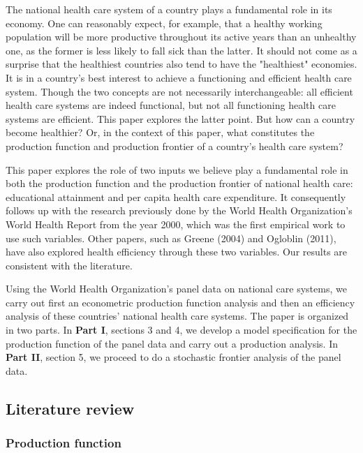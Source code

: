 \documentclass[12pt,a4paper]{article}\usepackage[]{graphicx}\usepackage[]{color}
\begin{document}
The national health care system of a country plays a fundamental role in its economy. One can reasonably expect, for example, that a healthy working population will be more productive throughout its active years than an unhealthy one, as the former is less likely to fall sick than the latter. It should not come as a surprise that the healthiest countries also tend to have the "healthiest" economies. It is in a country's best interest to achieve a functioning and efficient health care system. Though the two concepts are not necessarily interchangeable: all efficient health care systems are indeed functional, but not all functioning health care systems are efficient. This paper explores the latter point. But how can a country become healthier? Or, in the context of this paper, what constitutes the production function and production frontier of a country's health care system?

This paper explores the role of two inputs we believe play a fundamental role in both the production function and the production frontier of national health care: educational attainment and per capita health care expenditure. It consequently follows up with the research previously done by the World Health Organization's World Health Report from the year 2000, which was the first empirical work to use such variables.  Other papers, such as Greene (2004) and Ogloblin (2011), have also explored health efficiency through these two variables. Our results are consistent with the literature.

Using the World Health Organization's panel data on national care systems, we carry out first an econometric production function analysis and then an efficiency analysis of these countries' national health care systems. The paper is organized in two parts. In \textbf{Part I}, sections 3 and 4, we develop a model specification for the production function of the panel data and carry out a production analysis. In \textbf{Part II}, section 5, we proceed to do a stochastic frontier analysis of the panel data.

\subsection{Literature review}
\subsubsection{Production function}
\end{document}
